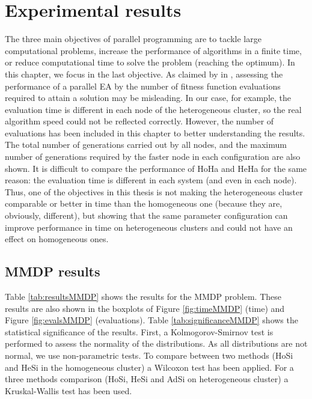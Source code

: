 \section{Experimental results}
The three main objectives of parallel programming are to tackle large
computational problems, increase the performance of algorithms in a
finite time, or reduce computational time to solve the problem
(reaching the optimum). In this chapter, we focus in the last
objective. %
As claimed by  in
\cite{Alba06evaluationParallel}, assessing the performance of a
parallel EA by the number of fitness function evaluations required to
attain a solution may be misleading. In our case, for example, the
evaluation time is different in each node of the heterogeneous
cluster, so the real algorithm speed could not be reflected
correctly. %
 However, the number of evaluations has been included in
this chapter to better understanding the results. %
The total number of
generations carried out by all nodes, and the maximum number of
generations required by the faster node in each configuration are also
shown. It is difficult to compare the performance of HoHa and HeHa for
the same reason: the evaluation time is different in each system (and
even in each node). Thus, one of the objectives in this thesis is not
making the heterogeneous cluster comparable or better in time than the
homogeneous one (because they are, obviously, different), but showing
that the same parameter configuration can improve performance in time
on heterogeneous clusters and could not have an effect on homogeneous
ones. 


\subsection{MMDP results}

Table \ref{tab:resultsMMDP} shows the results for the MMDP
problem. These results are also shown in the boxplots of Figure
\ref{fig:timeMMDP} (time) and Figure \ref{fig:evalsMMDP}
(evaluations). Table \ref{tab:significanceMMDP} shows the statistical
significance of the results. First, a Kolmogorov-Smirnov test is
performed to assess the normality of the distributions. As all
distributions are not normal, we use non-parametric tests. To compare
between two methods (HoSi and HeSi in the homogeneous cluster) a
Wilcoxon test has been applied. For a three methods comparison (HoSi,
HeSi and AdSi on heterogeneous cluster) a Kruskal-Wallis test has been
used. %

